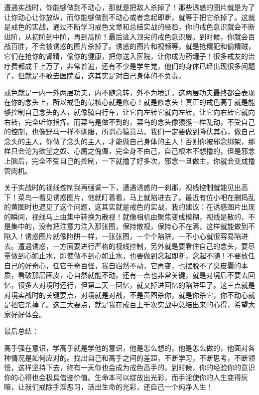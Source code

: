 遭遇实战时，你能够做到不动心，那就是把敌人杀掉了！那些诱惑的图片就是为了让你动心让你放纵，而你能够做到不动心或者念起即断，就等于把它杀掉了。这就是戒色的实战，通过不断学习戒色文章和总结实战的经验，你的戒色意识就会不断进阶，从初阶到中阶，再到高阶！最后进入顶尖的戒色意识层。到时候，你就会百战百胜，不会被诱惑的图片杀掉了。诱惑的图片和视频等，就是抢精犯和偷精贼，它们在抢你的肾精，偷你的健康，把你送入医院，让你成为药罐子！很多戒友的治疗费都成千上万了，非常普遍，还有不少是学生党，他们的身体已经出现很多问题了，但就是不敢去医院看，这其实是对自己身体的不负责。

戒色就是一内一外两层功夫，内不随念转，外不为境迁。这两层功夫最终都会表现在你的念头上，所以戒色的最核心就是修心！就是修念头！真正的戒色高手就是能够控制自己念头的人，就像骑自行车，让它向左转它就向左转，让它向右转它就向右转，完全听你指挥。而菜鸟是做不到的，菜鸟的念头像猿猴一样乱动，不受自己的控制，也像野马一样不驯服，所谓心猿意马。我们一定要做到降伏其心，做自己念头的主人，你做了念头的主人，才能做自己身体的主人！否则你被邪念绑架，那样只会沦为欲望之奴、心魔之傀儡，完全身不由己，自己根本不想撸的，但是邪念上脑后，完全不受自己的控制，一下就撸了好多次，邪念一旦做主，你就会变成撸管肉机。

关于实战时的视线控制我再强调一下，遭遇诱惑的一刹那，视线控制就能见出高下！菜鸟一看见诱惑图片，他就盯着看，马上就陷进去了。最近有位小吧在删捣乱的黄图时也遇见了这个问题，这其实就是戒色的实战，我的建议：在诱惑图片出现的瞬间，视线马上由集中转换为散视！就像相机由聚焦变成模糊，视线是散的，不是集中的，没有把注意力注入那张图，保持散视，保持心不在焉，这样就能做到不陷入！诱惑图片就像陷阱一样，一张张图，一个个陷阱，一不小心就很容易陷进去。遭遇诱惑，一方面要进行严格的视线控制，另外就是要看住自己的念头，要尽量做到心如止水，即使做不到心如止水，也要做到念起即断，念起不随！不要放任自己的好奇心，任它千奇百怪，我自岿然不动，它再变，也摆脱不了臭皮囊的本质，看破那层画皮，心自然就能不动。还有一点也非常关键，就是对境后不要去回忆，很多人对境时还行，但第二天一回忆，就又掉进回忆的陷阱里了。这三点就是对境实战时的关键要点，对境就是对战，不是黄图杀你，就是你杀它，你不动心就是把它杀掉了。这三大要点，就是我在成百上千次实战中总结出来的心得，希望大家好好体会。

最后总结：

高手强在意识，学高手就是学他的意识，他是怎么想的，他是怎么做的，他面对各种情况是如何应对的。找出自己和高手之间的差距，不断学习，不断思考，不断领悟，这样坚持下去，终有一天你也会成为戒色高手的。到时候，你的经验你的意识你的心得也会极具借鉴价值。生命本可以绽放出光彩，而手淫使你的人生变得灰暗，让我们戒除手淫恶习，活出生命的光彩，还自己一个纯净人生！

